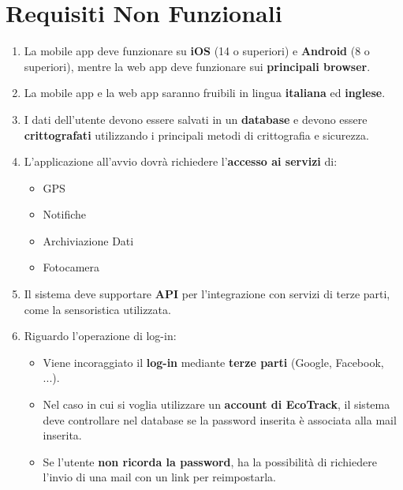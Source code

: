 \section{Requisiti Non Funzionali}

\begin{enumerate}[start=1,label=\textbf{RNF\theenumi}, labelwidth=4em, left=0pt, labelsep=1em, align=left]

    \item \label{itm:RNF1} La mobile app deve funzionare su \textbf{iOS} (14 o superiori) e \textbf{Android} (8 o superiori), mentre la web app deve funzionare sui \textbf{principali browser}.
    
    \item \label{itm:RNF2} La mobile app e la web app saranno fruibili in lingua \textbf{italiana} ed \textbf{inglese}.
    
    \item \label{itm:RNF3} I dati dell’utente devono essere salvati in un \textbf{database} e devono essere \textbf{crittografati} utilizzando i principali metodi di crittografia e sicurezza.
    
    \item \label{itm:RNF4} L’applicazione all’avvio dovrà richiedere l’\textbf{accesso ai servizi} di: 
    \begin{itemize}
        \item GPS
        \item Notifiche
        \item Archiviazione Dati
        \item Fotocamera
    \end{itemize}
    
    \item \label{itm:RNF5} Il sistema deve supportare \textbf{API} per l'integrazione con servizi di terze parti, come la sensoristica utilizzata.
    
    \item \label{itm:RNF6} Riguardo l'operazione di log-in:
    \begin{itemize}
        \item Viene incoraggiato il \textbf{log-in} mediante \textbf{terze parti} (Google, Facebook, ...).
        \item Nel caso in cui si voglia utilizzare un \textbf{account di EcoTrack}, il sistema deve controllare nel database se la password inserita è associata alla mail inserita.
        \item Se l’utente \textbf{non ricorda la password}, ha la possibilità di richiedere l'invio di una mail con un link per reimpostarla.
    \end{itemize}


\end{enumerate}
